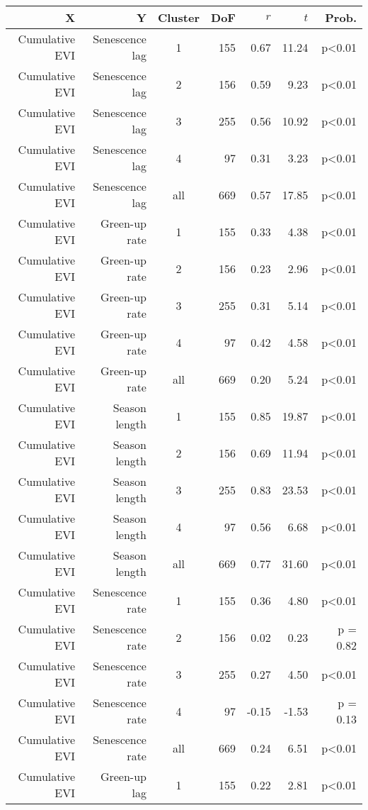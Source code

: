 \begin{table}[H]
\centering
\begin{tabular}{rrcrrrr}
  \hline
X & Y & Cluster & DoF & $r$ & $t$ & Prob. \\ 
  \hline
Cumulative EVI & Senescence lag & 1 & 155 & 0.67 & 11.24 & p<0.01 \\ 
  Cumulative EVI & Senescence lag & 2 & 156 & 0.59 & 9.23 & p<0.01 \\ 
  Cumulative EVI & Senescence lag & 3 & 255 & 0.56 & 10.92 & p<0.01 \\ 
  Cumulative EVI & Senescence lag & 4 &  97 & 0.31 & 3.23 & p<0.01 \\ 
  Cumulative EVI & Senescence lag & all & 669 & 0.57 & 17.85 & p<0.01 \\ 
   \hline
Cumulative EVI & Green-up rate & 1 & 155 & 0.33 & 4.38 & p<0.01 \\ 
  Cumulative EVI & Green-up rate & 2 & 156 & 0.23 & 2.96 & p<0.01 \\ 
  Cumulative EVI & Green-up rate & 3 & 255 & 0.31 & 5.14 & p<0.01 \\ 
  Cumulative EVI & Green-up rate & 4 &  97 & 0.42 & 4.58 & p<0.01 \\ 
  Cumulative EVI & Green-up rate & all & 669 & 0.20 & 5.24 & p<0.01 \\ 
   \hline
Cumulative EVI & Season length & 1 & 155 & 0.85 & 19.87 & p<0.01 \\ 
  Cumulative EVI & Season length & 2 & 156 & 0.69 & 11.94 & p<0.01 \\ 
  Cumulative EVI & Season length & 3 & 255 & 0.83 & 23.53 & p<0.01 \\ 
  Cumulative EVI & Season length & 4 &  97 & 0.56 & 6.68 & p<0.01 \\ 
  Cumulative EVI & Season length & all & 669 & 0.77 & 31.60 & p<0.01 \\ 
   \hline
Cumulative EVI & Senescence rate & 1 & 155 & 0.36 & 4.80 & p<0.01 \\ 
  Cumulative EVI & Senescence rate & 2 & 156 & 0.02 & 0.23 & p = 0.82 \\ 
  Cumulative EVI & Senescence rate & 3 & 255 & 0.27 & 4.50 & p<0.01 \\ 
  Cumulative EVI & Senescence rate & 4 &  97 & -0.15 & -1.53 & p = 0.13 \\ 
  Cumulative EVI & Senescence rate & all & 669 & 0.24 & 6.51 & p<0.01 \\ 
   \hline
Cumulative EVI & Green-up lag & 1 & 155 & 0.22 & 2.81 & p<0.01 \\ 

\end{tabular}
\end{table}
